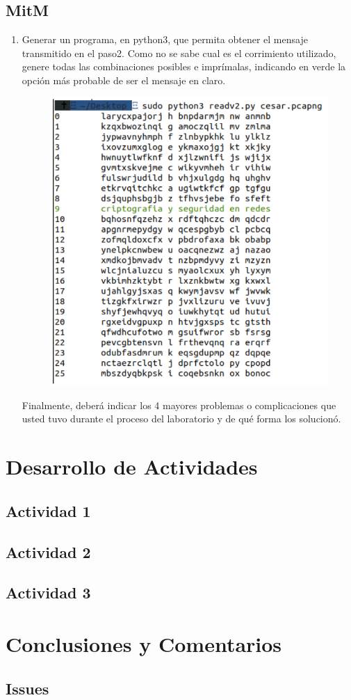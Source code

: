 \documentclass[letter,12pt]{article}
\begin{document}
\subsection{MitM}
\begin{enumerate}
    \item Generar un programa, en python3, que permita obtener el mensaje transmitido en el paso2. Como no se sabe cual es el corrimiento utilizado, genere todas las combinaciones posibles e imprímalas, indicando en verde la opción más probable de ser el mensaje en claro.
    \begin{figure}[H]
        \centering
        \includegraphics[width=12cm]{actividades/A3.png}
        \label{fig:a3}
    \end{figure}
    Finalmente, deberá indicar los 4 mayores problemas o complicaciones que usted tuvo durante el proceso del laboratorio y de qué forma los solucionó.

\end{enumerate}

\section{Desarrollo de Actividades}

\subsection{Actividad 1}

\subsection{Actividad 2}

\subsection{Actividad 3}

\section*{Conclusiones y Comentarios}

\subsection*{Issues}
\end{document}
